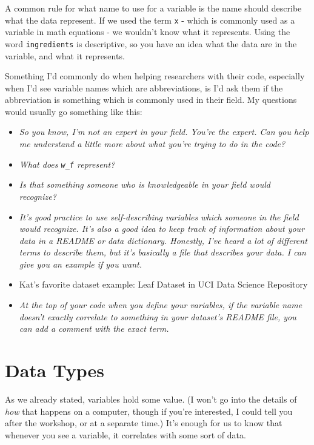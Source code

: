\documentclass[
]{book}
\providecommand{\tightlist}{%
  \setlength{\itemsep}{0pt}\setlength{\parskip}{0pt}}
\begin{document}
A common rule for what name to use for a variable is the name should describe what the data represent. If we used the term \texttt{x} - which is commonly used as a variable in math equations - we wouldn't know what it represents. Using the word \texttt{ingredients} is descriptive, so you have an idea what the data are in the variable, and what it represents.

Something I'd commonly do when helping researchers with their code, especially when I'd see variable names which are abbreviations, is I'd ask them if the abbreviation is something which is commonly used in their field. My questions would usually go something like this:

\begin{itemize}
\tightlist
\item
  \emph{So you know, I'm not an expert in your field. You're the expert. Can you help me understand a little more about what you're trying to do in the code?}
\item
  \emph{What does \texttt{w\_f} represent?}
\item
  \emph{Is that something someone who is knowledgeable in your field would recognize?}
\item
  \emph{It's good practice to use self-describing variables which someone in the field would recognize. It's also a good idea to keep track of information about your data in a README or data dictionary. Honestly, I've heard a lot of different terms to describe them, but it's basically a file that describes your data. I can give you an example if you want.}
\item
  Kat's favorite dataset example: Leaf Dataset in UCI Data Science Repository \citep{leaf_288}
\item
  \emph{At the top of your code when you define your variables, if the variable name doesn't exactly correlate to something in your dataset's README file, you can add a comment with the exact term.}
\end{itemize}

\section{Data Types}\label{data-types-1}

As we already stated, variables hold some value. (I won't go into the details of \emph{how} that happens on a computer, though if you're interested, I could tell you after the workshop, or at a separate time.) It's enough for us to know that whenever you see a variable, it correlates with some sort of data.
\end{document}
